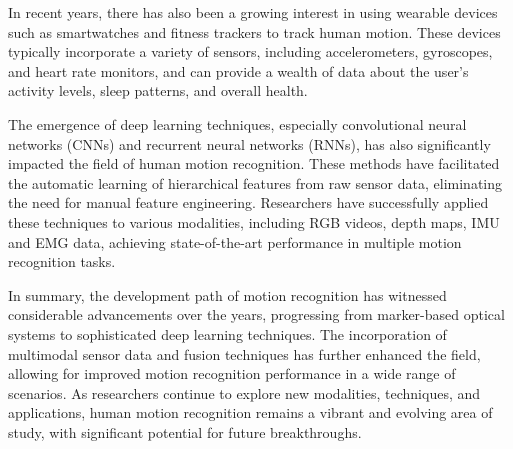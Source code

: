 \documentclass[12pt, a4paper]{article}
\begin{document}
In recent years, there has also been a growing interest in using wearable devices such as smartwatches and fitness trackers to track human motion. These devices typically incorporate a variety of sensors, including accelerometers, gyroscopes, and heart rate monitors, and can provide a wealth of data about the user's activity levels, sleep patterns, and overall health.

The emergence of deep learning techniques, especially convolutional neural networks (CNNs) and recurrent neural networks (RNNs), has also significantly impacted the field of human motion recognition. These methods have facilitated the automatic learning of hierarchical features from raw sensor data, eliminating the need for manual feature engineering. Researchers have successfully applied these techniques to various modalities, including RGB videos, depth maps, IMU and EMG data, achieving state-of-the-art performance in multiple motion recognition tasks.

In summary, the development path of motion recognition has witnessed considerable advancements over the years, progressing from marker-based optical systems to sophisticated deep learning techniques. The incorporation of multimodal sensor data and fusion techniques has further enhanced the field, allowing for improved motion recognition performance in a wide range of scenarios. As researchers continue to explore new modalities, techniques, and applications, human motion recognition remains a vibrant and evolving area of study, with significant potential for future breakthroughs.
\end{document}
